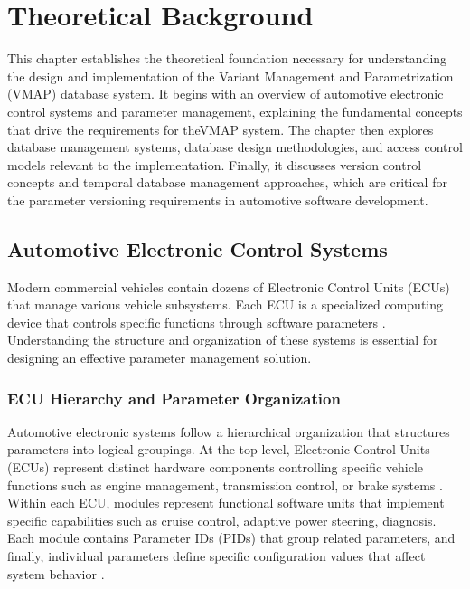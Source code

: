 \chapter{Theoretical Background}
\label{chap:theoretical-background}

This chapter establishes the theoretical foundation necessary for understanding the design and implementation of the Variant Management and Parametrization (VMAP) database system. It begins with an overview of automotive electronic control systems and parameter management, explaining the fundamental concepts that drive the requirements for the\ac{VMAP} system. The chapter then explores database management systems, database design methodologies, and access control models relevant to the implementation. Finally, it discusses version control concepts and temporal database management approaches, which are critical for the parameter versioning requirements in automotive software development.

\section{Automotive Electronic Control Systems}
\label{sec:automotive-electronic-systems}

Modern commercial vehicles contain dozens of Electronic Control Units (ECUs) that manage various vehicle subsystems. Each \ac{ECU} is a specialized computing device that controls specific functions through software parameters \cite{staron2021automotive}. Understanding the structure and organization of these systems is essential for designing an effective parameter management solution.

\subsection{ECU Hierarchy and Parameter Organization}
\label{subsec:ecu-hierarchy}

Automotive electronic systems follow a hierarchical organization that structures parameters into logical groupings. At the top level, Electronic Control Units (ECUs) represent distinct hardware components controlling specific vehicle functions such as engine management, transmission control, or brake systems \cite{kiencke2000automotive}. Within each \ac{ECU}, modules represent functional software units that implement specific capabilities such as cruise control, adaptive power steering, diagnosis. Each module contains Parameter IDs (PIDs) that group related parameters, and finally, individual parameters define specific configuration values that affect system behavior \cite{staron2021autosar}.


